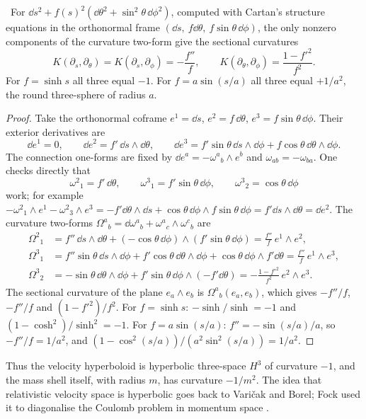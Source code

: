 \begin{proposition}\label{prop:warped}\ver\
For $\dd s^2+f(s)^2(\dd\theta^2+\sin^2\theta\,\dd\phi^2)$, computed with Cartan's structure equations in the orthonormal frame $(\dd s,\ f\dd\theta,\ f\sin\theta\,\dd\phi)$, the only nonzero components of the curvature two-form give the sectional curvatures
\[
K(\partial_s,\partial_\theta)=K(\partial_s,\partial_\phi)=-\frac{f''}{f},\qquad K(\partial_\theta,\partial_\phi)=\frac{1-f'^2}{f^2}.
\]
For $f=\sinh s$ all three equal $-1$. For $f=a\sin(s/a)$ all three equal $+1/a^2$, the round three-sphere of radius $a$.
\end{proposition}
\begin{proof}
Take the orthonormal coframe $e^1=\dd s$, $e^2=f\,\dd\theta$, $e^3=f\sin\theta\,\dd\phi$. Their exterior derivatives are
\[
\dd e^1=0,\qquad \dd e^2=f'\,\dd s\wedge\dd\theta,\qquad \dd e^3=f'\sin\theta\,\dd s\wedge\dd\phi+f\cos\theta\,\dd\theta\wedge\dd\phi .
\]
The connection one-forms are fixed by $\dd e^a=-\omega^a{}_b\wedge e^b$ and $\omega_{ab}=-\omega_{ba}$. One checks directly that
\[
\omega^2{}_1=f'\,\dd\theta,\qquad \omega^3{}_1=f'\sin\theta\,\dd\phi,\qquad \omega^3{}_2=\cos\theta\,\dd\phi
\]
work; for example $-\omega^2{}_1\wedge e^1-\omega^2{}_3\wedge e^3=-f'\dd\theta\wedge\dd s+\cos\theta\,\dd\phi\wedge f\sin\theta\,\dd\phi=f'\dd s\wedge\dd\theta=\dd e^2$. The curvature two-forms $\Omega^a{}_b=\dd\omega^a{}_b+\omega^a{}_c\wedge\omega^c{}_b$ are
\begin{align*}
\Omega^2{}_1&=f''\,\dd s\wedge\dd\theta+(-\cos\theta\,\dd\phi)\wedge(f'\sin\theta\,\dd\phi)=\frac{f''}f\,e^1\wedge e^2,\\
\Omega^3{}_1&=f''\sin\theta\,\dd s\wedge\dd\phi+f'\cos\theta\,\dd\theta\wedge\dd\phi+\cos\theta\,\dd\phi\wedge f'\dd\theta=\frac{f''}f\,e^1\wedge e^3,\\
\Omega^3{}_2&=-\sin\theta\,\dd\theta\wedge\dd\phi+f'\sin\theta\,\dd\phi\wedge(-f'\dd\theta)=-\frac{1-f'^2}{f^2}\,e^2\wedge e^3 .
\end{align*}
The sectional curvature of the plane $e_a\wedge e_b$ is $\Omega^a{}_b(e_a,e_b)$, which gives $-f''/f$, $-f''/f$ and $(1-f'^2)/f^2$. For $f=\sinh s$: $-\sinh/\sinh=-1$ and $(1-\cosh^2)/\sinh^2=-1$. For $f=a\sin(s/a)$: $f''=-\sin(s/a)/a$, so $-f''/f=1/a^2$, and $(1-\cos^2(s/a))/(a^2\sin^2(s/a))=1/a^2$.
\end{proof}


Thus the velocity hyperboloid is hyperbolic three-space $H^3$ of curvature $-1$, and the mass shell itself, with radius $m$, has curvature $-1/m^2$. The idea that relativistic velocity space is hyperbolic goes back to Vari\v{c}ak and Borel; Fock used it to diagonalise the Coulomb problem in momentum space \cite{Fock1935}.

